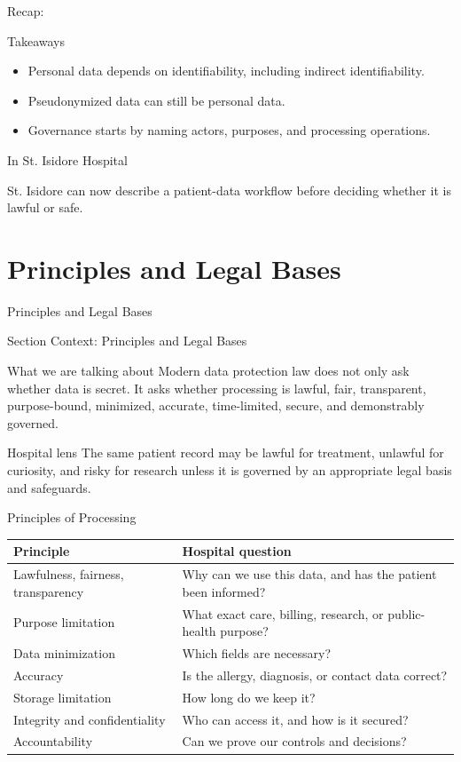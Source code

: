 \documentclass[presentation]{beamer}
\newcommand{\sectiontitleframe}[1]{
\begin{frame}[plain,c]
\begin{center}
{\usebeamerfont{title}\usebeamercolor[fg]{title}#1}
\end{center}
\end{frame}
}
\newcommand{\scenario}{St. Isidore Hospital}
\newcommand{\takeawaysframe}[2]{
\begin{frame}[c]{Recap: \insertsection}
\begin{block}{Takeaways}
#1
\end{block}
\begin{exampleblock}{In \scenario}
#2
\end{exampleblock}
\end{frame}
}
\begin{document}
\takeawaysframe{
\begin{itemize}
    \item Personal data depends on identifiability, including indirect identifiability.
    \item Pseudonymized data can still be personal data.
    \item Governance starts by naming actors, purposes, and processing operations.
\end{itemize}
}{
St. Isidore can now describe a patient-data workflow before deciding whether it is lawful or safe.
}

\section{Principles and Legal Bases}
\sectiontitleframe{Principles and Legal Bases}

\begin{frame}[c]{Section Context: Principles and Legal Bases}
\begin{block}{What we are talking about}
Modern data protection law does not only ask whether data is secret. It asks whether processing is
lawful, fair, transparent, purpose-bound, minimized, accurate, time-limited, secure, and
demonstrably governed.
\end{block}

\begin{exampleblock}{Hospital lens}
The same patient record may be lawful for treatment, unlawful for curiosity, and risky for research
unless it is governed by an appropriate legal basis and safeguards.
\end{exampleblock}
\end{frame}

\begin{frame}[c]{Principles of Processing}
\small
\begin{tabularx}{\textwidth}{@{}p{}X@{}}
\toprule
\textbf{Principle} & \textbf{Hospital question} \\
\midrule
Lawfulness, fairness, transparency & Why can we use this data, and has the patient been informed? \\
Purpose limitation & What exact care, billing, research, or public-health purpose? \\
Data minimization & Which fields are necessary? \\
Accuracy & Is the allergy, diagnosis, or contact data correct? \\
Storage limitation & How long do we keep it? \\
Integrity and confidentiality & Who can access it, and how is it secured? \\
Accountability & Can we prove our controls and decisions? \\
\bottomrule
\end{tabularx}
\end{frame}
\end{document}
